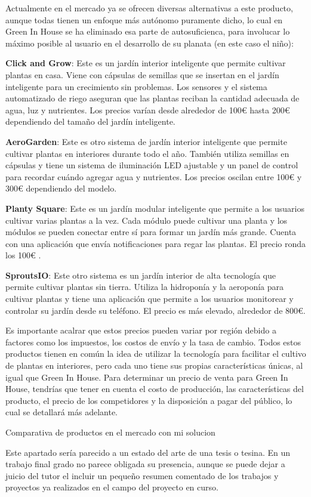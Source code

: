 
Actualmente en el mercado ya se ofrecen diversas alternativas a este producto, aunque todas tienen un enfoque más autónomo puramente dicho, lo cual en Green In House se ha eliminado esa parte de autosuficienca, para involucar lo máximo posible al usuario  en el desarrollo de su planata (en este caso el niño):

\textbf{Click and Grow}: Este es un jardín interior inteligente que permite cultivar plantas en casa. Viene con cápsulas de semillas que se insertan en el jardín inteligente para un crecimiento sin problemas. Los sensores y el sistema automatizado de riego aseguran que las plantas reciban la cantidad adecuada de agua, luz y nutrientes. Los precios varían desde alrededor de 100€ hasta 200€ dependiendo del tamaño del jardín inteligente.

\textbf{AeroGarden}: Este es otro sistema de jardín interior inteligente que permite cultivar plantas en interiores durante todo el año. También utiliza semillas en cápsulas y tiene un sistema de iluminación LED ajustable y un panel de control para recordar cuándo agregar agua y nutrientes. Los precios oscilan entre 100€ y 300€ dependiendo del modelo.

\textbf{Planty Square}: Este es un jardín modular inteligente que permite a los usuarios cultivar varias plantas a la vez. Cada módulo puede cultivar una planta y los módulos se pueden conectar entre sí para formar un jardín más grande. Cuenta con una aplicación que envía notificaciones para regar las plantas. El precio ronda los 100€ .

\textbf{SproutsIO}: Este otro sistema es un jardín interior de alta tecnología que permite cultivar plantas sin tierra. Utiliza la hidroponía y la aeroponía para cultivar plantas y tiene una aplicación que permite a los usuarios monitorear y controlar su jardín desde su teléfono. El precio es más elevado, alrededor de 800€.

Es importante acalrar que estos precios pueden variar por región debido a factores como los impuestos, los costos de envío y la tasa de cambio. Todos estos productos tienen en común la idea de utilizar la tecnología para facilitar el cultivo de plantas en interiores, pero cada uno tiene sus propias características únicas, al igual que Green In House. Para determinar un precio de venta para Green In House, tendrías que tener en cuenta el costo de producción, las características del producto, el precio de los competidores y la disposición a pagar del público, lo cual se detallará más adelante.





Comparativa de productos en el mercado con mi solucion

Este apartado sería parecido a un estado del arte de una tesis o tesina. En un trabajo final grado no parece obligada su presencia, aunque se puede dejar a juicio del tutor el incluir un pequeño resumen comentado de los trabajos y proyectos ya realizados en el campo del proyecto en curso. 
